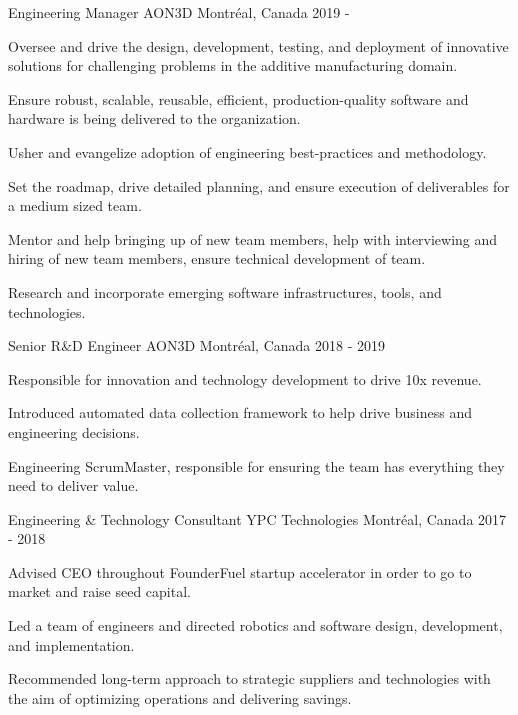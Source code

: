 \documentclass[11pt, letterpaper]{awesome-cv}
\begin{document}
\begin{cventries}

\cventry
{Engineering Manager}
{AON3D}
{Montréal, Canada}
{2019 - }
{
\begin{cvitems} 
\item{Oversee and drive the design, development, testing, and deployment of innovative solutions for challenging problems in the additive manufacturing domain.}
\item{Ensure robust, scalable, reusable, efficient, production-quality software and hardware is being delivered to the organization.}
\item{Usher and evangelize adoption of engineering best-practices and methodology.}
\item{Set the roadmap, drive detailed planning, and ensure execution of deliverables for a medium sized team.}
\item{Mentor and help bringing up of new team members, help with interviewing and hiring of new team members, ensure technical development of team.}
\item{Research and incorporate emerging software infrastructures, tools, and technologies.}
\end{cvitems}
}

\cventry
{Senior R&D Engineer}
{AON3D}
{Montréal, Canada}
{2018 - 2019}
{
\begin{cvitems} 
\item{Responsible for innovation and technology development to drive 10x revenue.}
\item{Introduced automated data collection framework to help drive business and engineering decisions.}
\item{Engineering ScrumMaster, responsible for ensuring the team has everything they need to deliver value.}
\end{cvitems}
}

\cventry
{Engineering & Technology Consultant}
{YPC Technologies}
{Montréal, Canada}
{2017 - 2018}
{
\begin{cvitems} 
\item{Advised CEO throughout FounderFuel startup accelerator in order to go to market and raise seed capital.}
\item{Led a team of engineers and directed robotics and software design, development, and implementation.}
\item{Recommended long-term approach to strategic suppliers and technologies with the aim of optimizing operations and delivering savings.}
\end{cvitems}
}


\end{cventries}
\end{document}
